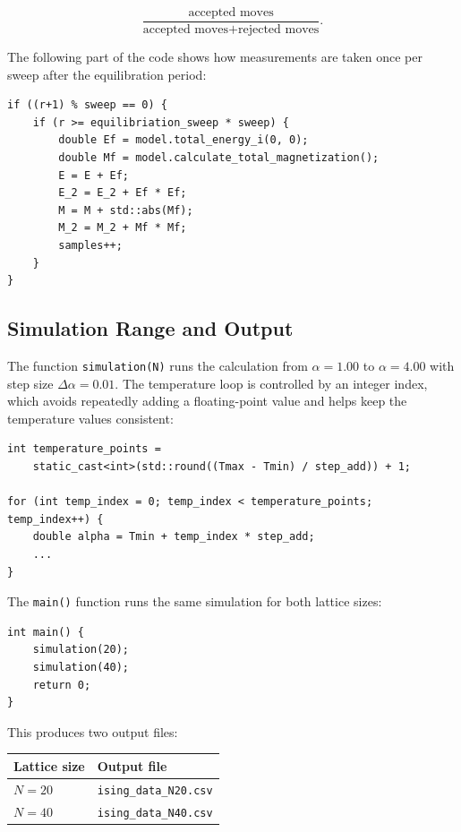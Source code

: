 \documentclass[11pt]{article}
\let\oldsubsection\subsection
\renewcommand{\subsection}[1]{\Needspace{2\baselineskip}\oldsubsection{#1}}
\begin{document}
\medskip

\begin{equation}
\frac{\text{accepted moves}}{\text{accepted moves}+\text{rejected moves}}.
\end{equation}

The following part of the code shows how measurements are taken once per sweep after the equilibration period:

\begin{lstlisting}[style=cppstyle]
if ((r+1) % sweep == 0) {
    if (r >= equilibriation_sweep * sweep) {
        double Ef = model.total_energy_i(0, 0);
        double Mf = model.calculate_total_magnetization();
        E = E + Ef;
        E_2 = E_2 + Ef * Ef;
        M = M + std::abs(Mf);
        M_2 = M_2 + Mf * Mf;
        samples++;
    }
}
\end{lstlisting}

\subsection{Simulation Range and Output}

The function \texttt{simulation(N)} runs the calculation from $\alpha=1.00$ to $\alpha=4.00$ with step size $\Delta\alpha=0.01$. The temperature loop is controlled by an integer index, which avoids repeatedly adding a floating-point value and helps keep the temperature values consistent:

\begin{lstlisting}[style=cppstyle]
int temperature_points =
    static_cast<int>(std::round((Tmax - Tmin) / step_add)) + 1;

for (int temp_index = 0; temp_index < temperature_points; temp_index++) {
    double alpha = Tmin + temp_index * step_add;
    ...
}
\end{lstlisting}

The \texttt{main()} function runs the same simulation for both lattice sizes:

\begin{lstlisting}[style=cppstyle]
int main() {
    simulation(20);
    simulation(40);
    return 0;
}
\end{lstlisting}

This produces two output files:

\begin{center}
\begin{tabular}{ll}
\toprule
Lattice size & Output file \\
\midrule
$N=20$ & \texttt{ising\_data\_N20.csv} \\
$N=40$ & \texttt{ising\_data\_N40.csv} \\
\bottomrule
\end{tabular}
\end{center}
\end{document}
